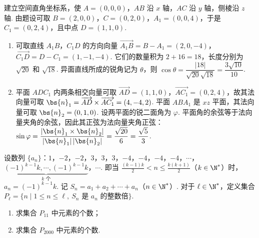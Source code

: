 \begin{solution}
建立空间直角坐标系，使 \(A=(0,0,0)\)，\(AB\) 沿 \(x\) 轴，\(AC\) 沿 \(y\) 轴，侧棱沿 \(z\) 轴. 由题设可取 \(B=(2,0,0)\)，\(C=(0,2,0)\)，\(A_1=(0,0,4)\)，于是 \(C_1=(0,2,4)\)，且中点 \(D=(1,1,0)\).
\begin{enumerate}
\item 可取直线 \(A_1B\)，\(C_1D\) 的方向向量
\(\overrightarrow{A_1B}=B-A_1=(2,0,-4)\)，\(\overrightarrow{C_1D}=D-C_1=(1,-1,-4)\). 它们的数量积为 \(2+16=18\)，长度分别为 \(\sqrt{20}\) 和 \(\sqrt{18}\). 异面直线所成的锐角记为 \(\theta\)，则
\(\cos\theta=\dfrac{|18|}{\sqrt{20}\sqrt{18}}=\dfrac{3\sqrt{10}}{10}\).

\item 平面 \(ADC_1\) 内两条相交向量可取 \(\overrightarrow{AD}=(1,1,0)\)，\(\overrightarrow{AC_1}=(0,2,4)\)，故其法向量可取
\(\bs{n}_1=\overrightarrow{AD}\times\overrightarrow{AC_1}=(4,-4,2)\). 平面 \(ABA_1\) 是 \(xz\) 平面，其法向量可取 \(\bs{n}_2=(0,1,0)\). 设两平面的锐二面角为 \(\varphi\). 平面角的余弦等于法向量夹角的余弦，因此其正弦为法向量夹角正弦：
\(\sin\varphi=\dfrac{|\bs{n}_1\times\bs{n}_2|}{|\bs{n}_1|\,|\bs{n}_2|}=\dfrac{\sqrt{20}}{6}=\dfrac{\sqrt5}{3}\).
\end{enumerate}
\end{solution}

\begin{problem}
设数列 \(\{a_n\}\)：\(1\)，\(-2\)，\(-2\)，\(3\)，\(3\)，\(3\)，\(-4\)，\(-4\)，\(-4\)，\(-4\)，\(\cdots\)，\(\underbrace{(-1)^{k-1}k,\cdots,(-1)^{k-1}k}_{k\text{ 个}}\)，\(\cdots\). 即当 \(\frac{(k-1)k}{2}<n\leqslant \frac{k(k+1)}{2}\)（\(k\in\N^*\)）时，\(a_n=(-1)^{k-1}k\). 记 \(S_n=a_1+a_2+\cdots+a_n\)（\(n\in\N^*\)）. 对于 \(\ell\in\N^*\)，定义集合 \(P_{\ell}=\{n\mid 1\leqslant n\leqslant \ell,\ S_n\text{ 是 }a_n\text{ 的整数倍}\}\).

\begin{enumerate}
\item 求集合 \(P_{11}\) 中元素的个数；
\item 求集合 \(P_{2000}\) 中元素的个数.
\end{enumerate}
\end{problem}

